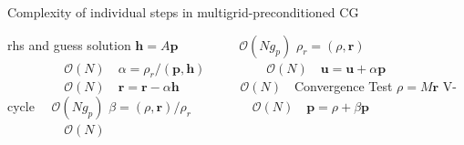 \documentclass[smallcondensed,final]{svjour3}     %
\newcommand{\bs}[1]{\ensuremath{\boldsymbol #1}}
\begin{document}
\begin{algorithm}[ht] 
  \caption{Complexity of individual steps in multigrid-preconditioned CG} \label{alg:pcg} 
  \begin{algorithmic}[1]
    \Require rhs and guess
    \Ensure  solution
    \State $\bs{h} = A \bs{p}$ 											\Comment $~~\quad\quad\quad\quad\mathcal{O}(Ng_p)$
    \State $\rho_r = (\rho, \bs{r})$								\Comment $~~\quad\quad\quad\quad\mathcal{O}(N)~~~$
    \State $\alpha = \rho_r / ( \bs{p}, \bs{h} )$		\Comment $~~\quad\quad\quad\quad\mathcal{O}(N)~~~$
    \State $\bs{u} = \bs{u} + \alpha\bs{p}$					\Comment $~~\quad\quad\quad\quad\mathcal{O}(N)~~~$
    \State $\bs{r} = \bs{r} - \alpha\bs{h}$					\Comment $~~\quad\quad\quad\quad\mathcal{O}(N)~~~$
    \State Convergence Test
    \State $\rho = M\bs{r}$ 												\Comment V-cycle $\quad\mathcal{O}(Ng_p)$
    \State $\beta = (\rho, \bs{r}) / \rho_r$				\Comment $~~\quad\quad\quad\quad\mathcal{O}(N)~~~$
    \State $\bs{p} = \rho + \beta\bs{p}$						\Comment $~~\quad\quad\quad\quad\mathcal{O}(N)~~~$
    \EndWhile
  \end{algorithmic}
\end{algorithm}
\end{document}
